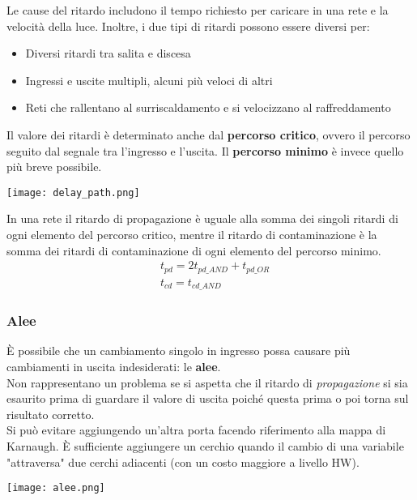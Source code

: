\begin{note}
	Le cause del ritardo includono il tempo richiesto per caricare in una rete e la velocità della luce. Inoltre, i due tipi di ritardi possono essere diversi per:
	\begin{itemize}
		\item Diversi ritardi tra salita e discesa
		\item Ingressi e uscite multipli, alcuni più veloci di altri
		\item Reti che rallentano al surriscaldamento e si velocizzano al raffreddamento
	\end{itemize}
\end{note}
Il valore dei ritardi è determinato anche dal \textbf{percorso critico}, ovvero il percorso seguito dal segnale tra l'ingresso e l'uscita. Il \textbf{percorso minimo} è invece quello più breve possibile.
\begin{center}
	\texttt{[image: delay\_path.png]}
\end{center}
In una rete il ritardo di propagazione è uguale alla somma dei singoli ritardi di ogni elemento del percorso critico, mentre il ritardo di contaminazione è la somma dei ritardi di contaminazione di ogni elemento del percorso minimo.
\begin{align}
	& t_{pd} = 2t_{pd\_AND} + t_{pd\_OR} \\
	& t_{cd} = t_{cd\_AND}
\end{align}

\subsubsection{Alee}
È possibile che un cambiamento singolo in ingresso possa causare più cambiamenti in uscita indesiderati: le \textbf{alee}.\\
Non rappresentano un problema se si aspetta che il ritardo di \textit{propagazione} si sia esaurito prima di guardare il valore di uscita poiché questa prima o poi torna sul risultato corretto.\\
Si può evitare aggiungendo un'altra porta facendo riferimento alla mappa di Karnaugh. È sufficiente aggiungere un cerchio quando il cambio di una variabile "attraversa" due cerchi adiacenti (con un costo maggiore a livello HW).
\begin{center}
	\texttt{[image: alee.png]}
\end{center}
